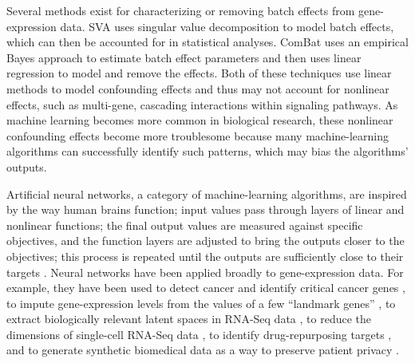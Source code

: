 \documentclass[11pt]{article}
\begin{document}
Several methods exist for characterizing or removing batch effects from gene-expression data.
SVA uses singular value decomposition to model batch effects, which can then be accounted for in statistical analyses\citep{leek_capturing_2007}.
ComBat uses an empirical Bayes approach to estimate batch effect parameters and then uses linear regression to model and remove the effects\citep{johnson_adjusting_2007}.
Both of these techniques use linear methods to model confounding effects and thus may not account for nonlinear effects, such as multi-gene, cascading interactions within signaling pathways.
As machine learning becomes more common in biological research, these nonlinear confounding effects become more troublesome because many machine-learning algorithms can successfully identify such patterns, which may bias the algorithms' outputs.

Artificial neural networks, a category of machine-learning algorithms, are inspired by the way human brains function; input values pass through layers of linear and nonlinear functions; the final output values are measured against specific objectives, and the function layers are adjusted to bring the outputs closer to the objectives; this process is repeated until the outputs are sufficiently close to their targets \citep{schmidhuber_deep_2015}.
Neural networks have been applied broadly to gene-expression data. For example, they have been used to detect cancer and identify critical cancer genes \citep{danaee_deep_2016}, to impute gene-expression levels from the values of a few ``landmark genes'' \citep{chen_gene_2016}, to extract biologically relevant latent spaces in RNA-Seq data \citep{way_extracting_2017}, to reduce the dimensions of single-cell RNA-Seq data \citep{lin_using_2017}, to identify drug-repurposing targets \citep{aliper_deep_2016}, and to generate synthetic biomedical data as a way to preserve patient privacy \citep{beaulieu-jones_privacy-preserving_2017}.
\end{document}
